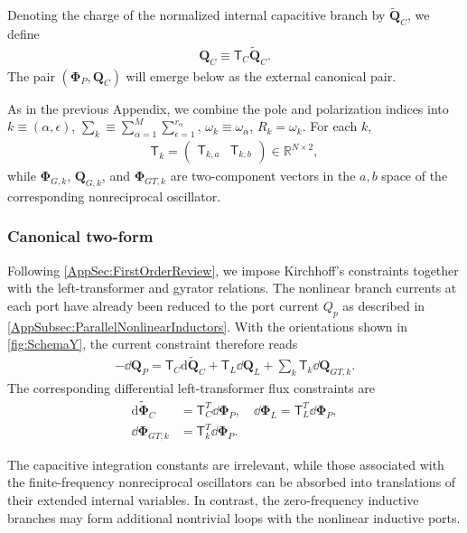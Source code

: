 \documentclass[prx,aps,twocolumn,article]{revtex4-2}
\newcommand{\msf}[1]{\mathsf{#1}}
\newcommand{\bsb}[1]{\boldsymbol{#1}}
\newcommand{\bPhi}{\bsb{\Phi}}
\newcommand{\bQ}{\bsb{Q}}
\newcommand{\dbQ}{\dd\bQ}
\newcommand{\dbPhi}{\dd\bPhi}
\newcommand{\msT}{\msf{T}}
\begin{document}
Denoting the charge of the normalized internal capacitive branch by
$\tilde{\bQ}_C$, we define
\begin{align}
    \bQ_C
    \equiv
    \msT_C\tilde{\bQ}_C.
    \label{Eq:QCwidetildeDefinition}
\end{align}
The pair $(\bPhi_P,\bQ_C)$ will emerge below as the external
canonical pair.

As in the previous Appendix, we combine the pole and polarization
indices into
$ k\equiv
    (\alpha,\epsilon)$, $\sum_k  \equiv \sum_{\alpha=1}^{M}
    \sum_{\epsilon=1}^{r_\alpha}$, $ \omega_k \equiv \omega_\alpha$,
$ R_k =\omega_k$. For each $k$,
\begin{align}
    \msT_k
    =
    \begin{pmatrix}
        \msT_{k,a}
        &
        \msT_{k,b}
    \end{pmatrix}
    \in
    \mathbb{R}^{N\times2},
\end{align}
while $\bPhi_{G,k}$, $\bQ_{G,k}$, and $\bPhi_{GT,k}$ are
two-component vectors in the $a,b$ space of the corresponding
nonreciprocal oscillator.

\subsubsection{Canonical two-form}
\label{Sec:TwoFormY}

Following \cref{AppSec:FirstOrderReview}, we impose Kirchhoff's
constraints together with the left-transformer and gyrator relations.
The nonlinear branch currents at each port have already been reduced
to the port current $Q_p$ as described in
\cref{AppSubsec:ParallelNonlinearInductors}. With the orientations
shown in \cref{fig:SchemaY}, the current constraint therefore reads
\begin{align}
    -\dbQ_P
    =
    \msT_C
    \mathrm{d}\tilde{\bQ}_C
    +
    \msT_L
    \dbQ_L
    +
    \sum_k
    \msT_k
    \dbQ_{GT,k}.
    \label{Eq:YCurrentConstraint}
\end{align}
The corresponding differential left-transformer flux constraints are
\begin{align}
    \mathrm{d}\tilde{\bPhi}_C
    &=
    \msT_C^T
    \dbPhi_P,
    \quad
    \dbPhi_L
    =
    \msT_L^T
    \dbPhi_P,
    \nonumber\\
    \dbPhi_{GT,k}
    &=
    \msT_k^T
    \dbPhi_P.
    \label{Eq:YFluxConstraints}
\end{align}

The capacitive integration constants are irrelevant, while those
associated with the finite-frequency nonreciprocal oscillators can be
absorbed into translations of their extended internal variables.
In contrast, the zero-frequency inductive branches may form additional
nontrivial loops with the nonlinear inductive ports.
\end{document}
